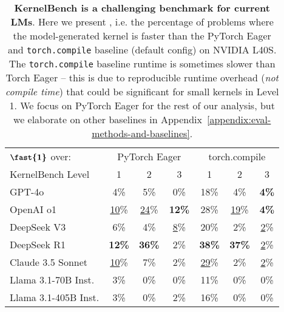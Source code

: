 \begin{table}[h]
\centering
\setlength{\tabcolsep}{2pt} %
\begin{tabular}{lccc|ccc}
    \toprule
    $\textbf{\fast{1}}$ over: & \multicolumn{3}{c}{PyTorch Eager} & \multicolumn{3}{c}{torch.compile} \\ 
    \cmidrule(lr){2-4} \cmidrule(lr){5-7}
    KernelBench Level & 1 & 2 & 3 & 1 & 2 & 3 \\ 
    \midrule
    GPT-4o              & 4\%  & 5\%  & 0\%  & 18\% & 4\%  & \textbf{4\%} \\
    OpenAI o1           & \underline{10}\% & \underline{24}\% & \textbf{12\%} & 28\% & \underline{19}\% & \textbf{4\%} \\
    DeepSeek V3         & 6\%  & 4\%  & \underline{8}\%  & 20\% & 2\%  & \underline{2}\%  \\
    DeepSeek R1         & \textbf{12\%} & \textbf{36\%} & 2\% & \textbf{38\%} & \textbf{37\%} & \underline{2}\%  \\
    Claude 3.5 Sonnet   & \underline{10}\% & 7\%  & 2\%  & \underline{29}\% & 2\%  & \underline{2}\%  \\
    Llama 3.1-70B Inst. & 3\%  & 0\%  & 0\%  & 11\% & 0\%  & 0\%  \\
    Llama 3.1-405B Inst.& 3\%  & 0\%  & 2\%  & 16\% & 0\%  & 0\%  \\
    \bottomrule
\end{tabular}

\caption{\textbf{KernelBench is a challenging benchmark for current LMs}. Here we present , i.e. the percentage of problems where the model-generated kernel is faster than the PyTorch Eager and \texttt{torch.compile} baseline (default config) on NVIDIA L40S. The \texttt{torch.compile} baseline runtime is sometimes slower than Torch Eager -- this is due to reproducible runtime overhead (\textit{not compile time}) that could be significant for small kernels in Level 1. We focus on PyTorch Eager for the rest of our analysis, but we elaborate on other baselines in Appendix~\ref{appendix:eval-methods-and-baselines}.}
\label{table:greedy-baseline}
\end{table}